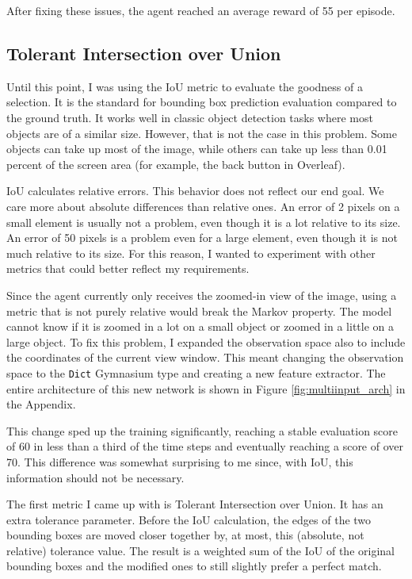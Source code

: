 \documentclass[
  digital,     %
  oneside,     %
  nosansbold,  %
  nocolorbold, %
  lof,         %
  lot,         %
]{fithesis4}
\begin{document}
After fixing these issues, the agent reached an average reward of 55 per episode.

\subsection{Tolerant Intersection over Union}
\label{subsec:eval_metric}

Until this point, I was using the IoU metric to evaluate the goodness of a selection. It is the standard for bounding box prediction evaluation compared to the ground truth. It works well in classic object detection tasks where most objects are of a similar size. However, that is not the case in this problem. Some objects can take up most of the image, while others can take up less than 0.01 percent of the screen area (for example, the back button in Overleaf).

IoU calculates relative errors. This behavior does not reflect our end goal. We care more about absolute differences than relative ones. An error of 2 pixels on a small element is usually not a problem, even though it is a lot relative to its size. An error of 50 pixels is a problem even for a large element, even though it is not much relative to its size. For this reason, I wanted to experiment with other metrics that could better reflect my requirements.

Since the agent currently only receives the zoomed-in view of the image, using a metric that is not purely relative would break the Markov property. The model cannot know if it is zoomed in a lot on a small object or zoomed in a little on a large object. To fix this problem, I expanded the observation space also to include the coordinates of the current view window. This meant changing the observation space to the \texttt{Dict} Gymnasium type and creating a new feature extractor. The entire architecture of this new network is shown in Figure \ref{fig:multiinput_arch} in the Appendix.

This change sped up the training significantly, reaching a stable evaluation score of 60 in less than a third of the time steps and eventually reaching a score of over 70. This difference was somewhat surprising to me since, with IoU, this information should not be necessary.

The first metric I came up with is Tolerant Intersection over Union. It has an extra tolerance parameter. Before the IoU calculation, the edges of the two bounding boxes are moved closer together by, at most, this (absolute, not relative) tolerance value. The result is a weighted sum of the IoU of the original bounding boxes and the modified ones to still slightly prefer a perfect match.
\end{document}
